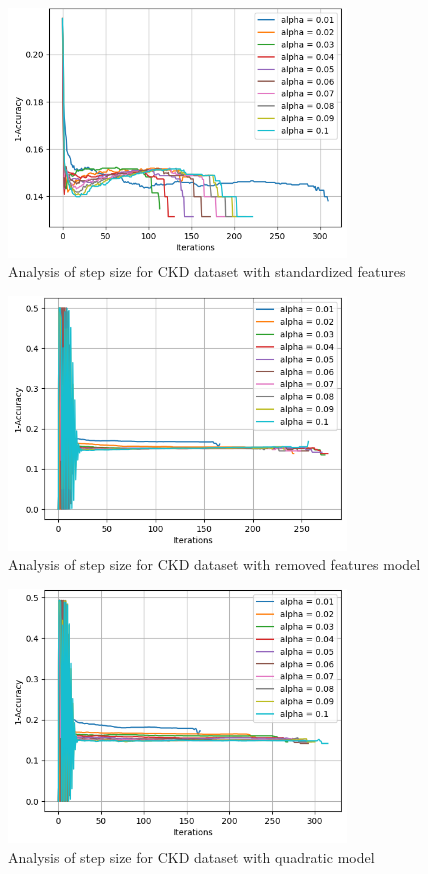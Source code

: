 \documentclass{article}
\begin{document}
\begin{figure}[H]
  \centering
  \includegraphics[width=0.8\textwidth]{CKDmodel2.png}
  \caption{Analysis of step size for CKD dataset with standardized features}
  \label{fig:quad_ckd}
\end{figure}

\begin{figure}[H]
  \centering
  \includegraphics[width=0.8\textwidth]{CKDmodel3.png}
  \caption{Analysis of step size for CKD dataset with removed features model}
  \label{fig:quad_ckd}
\end{figure}

\begin{figure}[H]
  \centering
  \includegraphics[width=0.8\textwidth]{CKDmodel4.png}
  \caption{Analysis of step size for CKD dataset with quadratic model}
  \label{fig:quad_ckd}
\end{figure}
\end{document}
